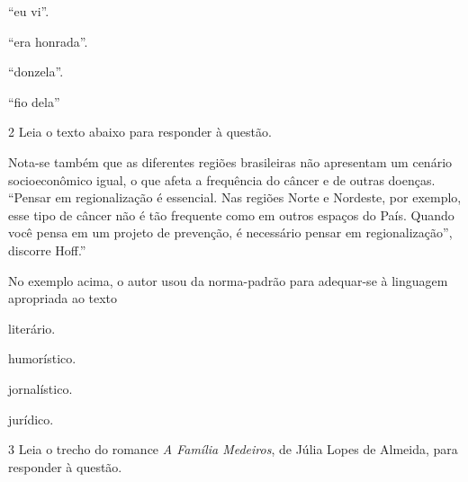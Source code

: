 \begin{escolha}
  
  \item ``eu vi''.
  
  \item ``era honrada''.
  
  \item ``donzela''.
  
  \item ``fio dela''

\end{escolha}

\num{2} Leia o texto abaixo para responder à questão.

\begin{myquote}
Nota-se também que as diferentes regiões brasileiras não apresentam um
cenário socioeconômico igual, o que afeta a frequência do câncer e de
outras doenças. ``Pensar em regionalização é essencial. Nas regiões Norte
e Nordeste, por exemplo, esse tipo de câncer não é tão frequente como em
outros espaços do País. Quando você pensa em um projeto de prevenção, é
necessário pensar em regionalização'', discorre Hoff.''

\end{myquote}

No exemplo acima, o autor usou da norma-padrão para adequar-se à linguagem apropriada ao texto

\begin{escolha}
  
  \item literário.
  
  \item humorístico.
  
  \item jornalístico.
  
  \item jurídico.

\end{escolha}

\num{3} Leia o trecho do romance \textit{A Família Medeiros}, de Júlia Lopes de Almeida, para 
responder à questão. 

